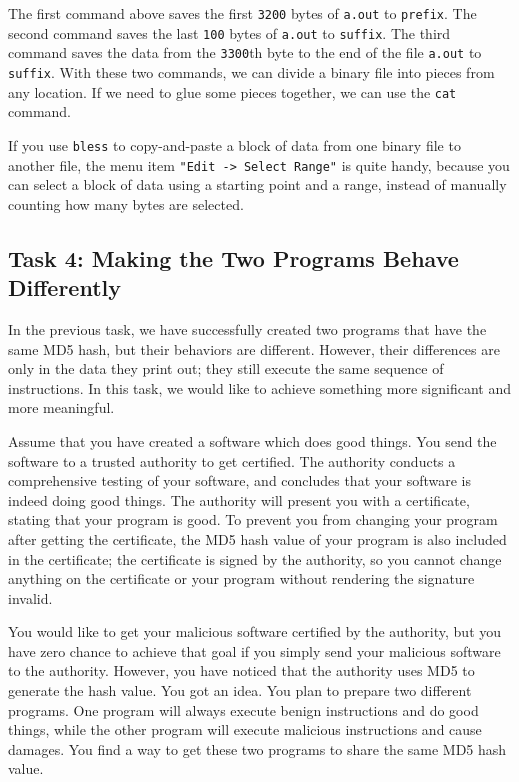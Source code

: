 The first command above saves the first \texttt{3200} bytes
of \texttt{a.out} to \texttt{prefix}. The second command 
saves the last \texttt{100} bytes of \texttt{a.out} 
to \texttt{suffix}. The third command 
saves the data from the \texttt{3300}th byte to the end of   
the file \texttt{a.out} to \texttt{suffix}.  With these two
commands, we can divide a binary file into pieces from 
any location. If we need to glue some pieces together, we can 
use the \texttt{cat} command.  


If you use \texttt{bless} to copy-and-paste a block of data from one binary file to another file, the
menu item \texttt{"Edit -> Select Range"} is quite handy, because you can select 
a block of data using a starting point and a range, instead of manually counting how 
many bytes are selected. 




\subsection{Task 4: Making the Two Programs Behave Differently}

In the previous task, we have successfully created two programs
that have the same MD5 hash, but their behaviors are different. 
However, their differences are only in the data they print out; they 
still execute the same sequence of instructions.  
In this task, we would like to achieve something more significant 
and more meaningful. 


Assume that you have created a software which does good things.
You send the software to a trusted authority to get certified. The authority
conducts a comprehensive testing of your software, and concludes that
your software is indeed doing good things. The authority 
will present you with a certificate, stating that your program
is good. To prevent you from changing your program after getting the certificate, the 
MD5 hash value of your program is also included in the certificate; the certificate is 
signed by the authority, so you cannot change anything on the certificate or
your program without rendering the signature invalid. 



You would like to get your malicious software certified by the authority, but you have zero
chance to achieve that goal if you simply send your malicious software to the authority. 
However, you have noticed that the authority uses MD5 to generate the hash value. You
got an idea. You plan 
to prepare two different programs. One program will always execute benign instructions and do
good things, while the other program will execute malicious instructions and cause damages. 
You find a way to get these two programs to share the same MD5 hash value. 


